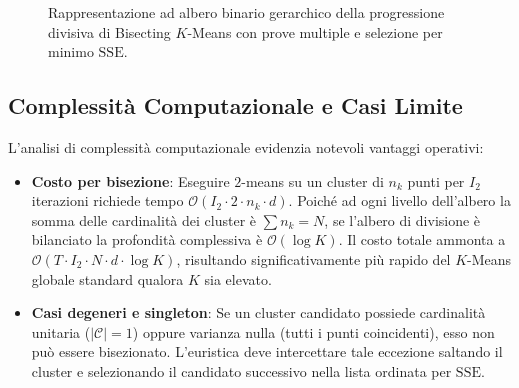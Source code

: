 \begin{figure}[htbp]
\caption{Rappresentazione ad albero binario gerarchico della progressione divisiva di Bisecting $K$-Means con prove multiple e selezione per minimo $\mathrm{SSE}$.}
\label{fig:dm-bisecting-kmeans-tree}
\end{figure}


\subsection{Complessità Computazionale e Casi Limite}

L'analisi di complessità computazionale evidenzia notevoli vantaggi operativi:
\begin{itemize}
    \item \textbf{Costo per bisezione}: Eseguire $2$-means su un cluster di $n_k$ punti per $I_2$ iterazioni richiede tempo $\mathcal{O}(I_2 \cdot 2 \cdot n_k \cdot d)$. Poiché ad ogni livello dell'albero la somma delle cardinalità dei cluster è $\sum n_k = N$, se l'albero di divisione è bilanciato la profondità complessiva è $\mathcal{O}(\log K)$. Il costo totale ammonta a $\mathcal{O}(T \cdot I_2 \cdot N \cdot d \cdot \log K)$, risultando significativamente più rapido del $K$-Means globale standard qualora $K$ sia elevato.
    \item \textbf{Casi degeneri e singleton}: Se un cluster candidato possiede cardinalità unitaria ($|\mathcal{C}| = 1$) oppure varianza nulla (tutti i punti coincidenti), esso non può essere bisezionato. L'euristica deve intercettare tale eccezione saltando il cluster e selezionando il candidato successivo nella lista ordinata per $\mathrm{SSE}$.
\end{itemize}

